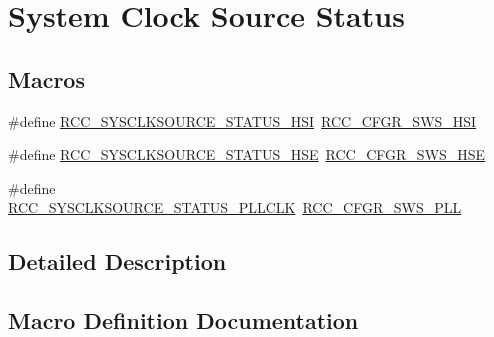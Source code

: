 \hypertarget{group___r_c_c___system___clock___source___status}{}\section{System Clock Source Status}
\label{group___r_c_c___system___clock___source___status}
\subsection*{Macros}
\begin{DoxyCompactItemize}
\item 
\#define \mbox{\hyperlink{group___r_c_c___system___clock___source___status_ga0d6c2b0b2d59e6591295649853bb2abd}{R\+C\+C\+\_\+\+S\+Y\+S\+C\+L\+K\+S\+O\+U\+R\+C\+E\+\_\+\+S\+T\+A\+T\+U\+S\+\_\+\+H\+SI}}~\mbox{\hyperlink{group___peripheral___registers___bits___definition_ga6764639cf221e1ebc0b5448dcaed590a}{R\+C\+C\+\_\+\+C\+F\+G\+R\+\_\+\+S\+W\+S\+\_\+\+H\+SI}}
\item 
\#define \mbox{\hyperlink{group___r_c_c___system___clock___source___status_ga3847769265bf19becf7b976a7e908a64}{R\+C\+C\+\_\+\+S\+Y\+S\+C\+L\+K\+S\+O\+U\+R\+C\+E\+\_\+\+S\+T\+A\+T\+U\+S\+\_\+\+H\+SE}}~\mbox{\hyperlink{group___peripheral___registers___bits___definition_gae09a0202f441c1a43e69c62331d50a08}{R\+C\+C\+\_\+\+C\+F\+G\+R\+\_\+\+S\+W\+S\+\_\+\+H\+SE}}
\item 
\#define \mbox{\hyperlink{group___r_c_c___system___clock___source___status_ga4f05019ec09da478d084f44dbaad7d6d}{R\+C\+C\+\_\+\+S\+Y\+S\+C\+L\+K\+S\+O\+U\+R\+C\+E\+\_\+\+S\+T\+A\+T\+U\+S\+\_\+\+P\+L\+L\+C\+LK}}~\mbox{\hyperlink{group___peripheral___registers___bits___definition_ga2c67e2279804a83ef24438267d9d4a6c}{R\+C\+C\+\_\+\+C\+F\+G\+R\+\_\+\+S\+W\+S\+\_\+\+P\+LL}}
\end{DoxyCompactItemize}


\subsection{Detailed Description}


\subsection{Macro Definition Documentation}
\mbox{\label{group___r_c_c___system___clock___source___status_ga3847769265bf19becf7b976a7e908a64}} 
